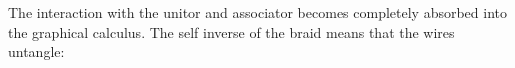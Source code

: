 The interaction with the unitor and associator becomes completely absorbed into the graphical calculus.
%
The self inverse of the braid means that the wires untangle:

